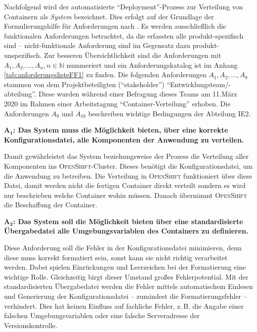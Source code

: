 Nachfolgend wird der automatisierte \enquote{Deployment}-Prozess zur Verteilung von Containern als \textit{System} bezeichnet. Dies erfolgt auf der Grundlage der Formulierungshilfe für Anforderungen nach \cite{rupp_formulierungsregel_2020}. Es werden ausschließlich die funktionalen Anforderungen \autocite[vgl.][]{international_organization_for_standardization_isoiec_2011,} betrachtet, da die erfassten alle produkt-spezifisch sind -- nicht-funktionale Anforderung sind im Gegensatz dazu produkt-unspezifisch. Zur besseren Übersichtlichkeit sind die Anforderungen mit $A_{1}, A_{2}, ..., A_{n}, n \in \mathbb{N}$ nummeriert und ein Anforderungskatalog ist im Anhang \vref{tab:anforderungslisteFF1} zu finden. Die folgenden Anforderungen $A_{1}, A_{2}, ..., A_{8}$ stammen von dem Projektbeteiligten (\enquote{stakeholder}) \enquote{Entwicklungsteam/-abteilung}. Diese wurden während einer Befragung dieses Teams am 11.März 2020 im Rahmen einer Arbeitstagung \enquote{Container-Verteilung} erhoben. Die Anforderungen $A_{9}$ und $A_{10}$ beschreiben wichtige Bedingungen der Abteilung \ac{IE2}. 
\par 
$\mathbf{A_{1}}$\textbf{: Das System muss die Möglichkeit bieten, über eine korrekte Konfigurationsdatei, alle Komponenten der Anwendung zu verteilen.}
\par
Damit gewährleistet das System beziehungsweise der Prozess die Verteilung aller Komponenten ins \textsc{OpenShift}-Cluster. Dieses benötigt die Konfigurationsdatei, um die Anwendung zu betreiben. Die Verteilung in \textsc{OpenShift} funktioniert über diese Datei, damit werden nicht die fertigen Container direkt verteilt sondern es wird nur beschrieben welche Container wohin müssen. Danach übernimmt \textsc{OpenShift} die Beschaffung der Container.
\par
$\mathbf{A_{2}}$\textbf{: Das System soll die Möglichkeit bieten über eine standardisierte Übergabedatei alle Umgebungsvariablen des Containers zu definieren.}
\par
Diese Anforderung soll die Fehler in der Konfigurationsdatei minimieren, denn diese muss korrekt formatiert sein, sonst kann sie nicht richtig verarbeitet werden. Dabei spielen Einrückungen und Leerzeichen bei der Formatierung eine wichtige Rolle. Gleichzeitig birgt dieser Umstand großes Fehlerpotential. Mit der standardisierten Übergabedatei werden die Fehler mittels automatischem Einlesen und Generierung der Konfigurationsdatei -- zumindest die Formatierungsfehler -- verhindert. Dies hat keinen Einfluss auf fachliche Fehler, z.\,B. die Angabe einer falschen Umgebungsvariablen oder eine falsche Serveradresse der Versionskontrolle.
